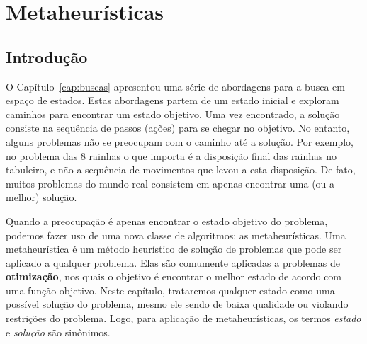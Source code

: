 \chapter{Metaheurísticas}


\section{Introdução}

O Capítulo~\ref{cap:buscas} apresentou uma série de abordagens para a busca em espaço de estados. Estas abordagens partem de um estado inicial e exploram caminhos para encontrar um estado objetivo. Uma vez encontrado, a solução consiste na sequência de passos (ações) para se chegar no objetivo. No entanto, alguns problemas não se preocupam com o caminho até a solução. Por exemplo, no problema das 8 rainhas o que importa é a disposição final das rainhas no tabuleiro, e não a sequência de movimentos que levou a esta disposição. De fato, muitos problemas do mundo real consistem em apenas encontrar uma (ou a melhor) solução.

Quando a preocupação é apenas encontrar o estado objetivo do problema, podemos fazer uso de uma nova classe de algoritmos: as metaheurísticas. Uma metaheurística é um método heurístico de solução de problemas que pode ser aplicado a qualquer problema. Elas são comumente aplicadas a problemas de \textbf{otimização}, nos quais o objetivo é encontrar o melhor estado de acordo com uma função objetivo. Neste capítulo, trataremos qualquer estado como uma possível solução do problema, mesmo ele sendo de baixa qualidade ou violando restrições do problema. Logo, para aplicação de metaheurísticas, os termos \textit{estado} e \textit{solução} são sinônimos.

